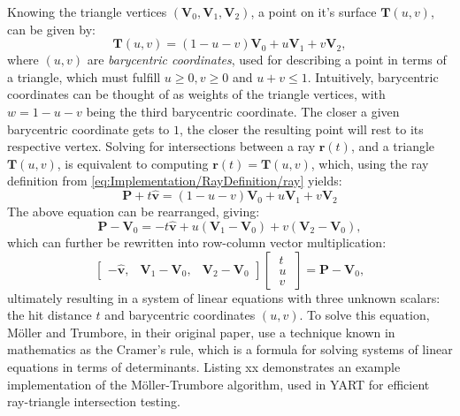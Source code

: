 Knowing the triangle vertices $ (\bm{V}_0, \bm{V}_1, \bm{V}_2) $, a point on it's surface $ \bm{T}(u, v) $, can be given by:
%
\begin{equation}
    \bm{T}(u, v) = (1 - u - v)\bm{V}_0 + u \bm{V}_1 + v \bm{V}_2,
\end{equation}
%
where $ (u, v) $ are \textit{barycentric coordinates}, used for describing a point in terms of a triangle, which must fulfill $ u \ge 0, v \ge 0 $ and $ u + v \le 1 $.
Intuitively, barycentric coordinates can be thought of as weights of the triangle vertices, with $ w = 1 - u - v $ being the third barycentric coordinate. 
The closer a given barycentric coordinate gets to $ 1 $, the closer the resulting point will rest to its respective vertex.
Solving for intersections between a ray $ \bm{r}(t) $, and a triangle $ \bm{T}(u, v) $, is equivalent to computing  $ \bm{r}(t) = \bm{T}(u, v) $, which, using the ray definition from \cref{eq:Implementation/RayDefinition/ray} yields:
%
\begin{equation}
    \bm{P} + t\bm{\hat{v}} = (1 - u - v)\bm{V}_0 + u \bm{V}_1 + v \bm{V}_2
\end{equation}
%
The above equation can be rearranged, giving:
%
\begin{equation}
    \bm{P} - \bm{V}_0 = -t\bm{\hat{v}} + u(\bm{V}_1 - \bm{V}_0) + v(\bm{V}_2 - \bm{V}_0),
\end{equation}
%
which can further be rewritten into row-column vector multiplication:
\begin{equation}
    \begin{bmatrix}
        -\bm{\hat{v}}, & \bm{V}_1 - \bm{V}_0, & \bm{V}_2 - \bm{V}_0
    \end{bmatrix}%
    \begin{bmatrix}
        \; t \; \\ \; u \; \\ \; v \;
    \end{bmatrix} = \bm{P} - \bm{V}_0,
\end{equation}
%
ultimately resulting in a system of linear equations with three unknown scalars: the hit distance $ t $ and barycentric coordinates $ (u, v) $.
To solve this equation, M{\"o}ller and Trumbore, in their original paper, use a technique known in mathematics as the Cramer's rule, which is a formula for solving systems of linear equations in terms of determinants. 
Listing xx demonstrates an example implementation of the M{\"o}ller-Trumbore algorithm, used in YART for efficient ray-triangle intersection testing.

